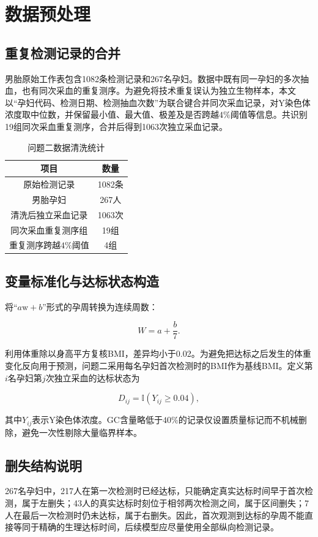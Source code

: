 \section{数据预处理}

\subsection{重复检测记录的合并}

男胎原始工作表包含1082条检测记录和267名孕妇。数据中既有同一孕妇的多次抽血，也有同次采血的重复测序。为避免将技术重复误认为独立生物样本，本文以“孕妇代码、检测日期、检测抽血次数”为联合键合并同次采血记录，对Y染色体浓度取中位数，并保留最小值、最大值、极差及是否跨越$4\%$阈值等信息。共识别19组同次采血重复测序，合并后得到1063次独立采血记录。

\begin{table}[H]
  \centering
  \caption{问题二数据清洗统计}
  \label{tab:q2-clean-summary}
  \begin{tabular}{cc}
    \toprule
    项目 & 数量 \\
    \midrule
    原始检测记录 & 1082条 \\
    男胎孕妇 & 267人 \\
    清洗后独立采血记录 & 1063次 \\
    同次采血重复测序组 & 19组 \\
    重复测序跨越$4\%$阈值 & 4组 \\
    \bottomrule
  \end{tabular}
\end{table}

\subsection{变量标准化与达标状态构造}

将“$a\mathrm{w}+b$”形式的孕周转换为连续周数：

\begin{equation}
  W=a+\frac{b}{7}.
  \label{eq:week-convert}
\end{equation}

利用体重除以身高平方复核BMI，差异均小于0.02。为避免把达标之后发生的体重变化反向用于预测，问题二采用每名孕妇首次检测时的BMI作为基线BMI。定义第$i$名孕妇第$j$次独立采血的达标状态为

\begin{equation}
  D_{ij}=\mathbb{I}\!\left(Y_{ij}\geq 0.04\right),
  \label{eq:q2-status}
\end{equation}

其中$Y_{ij}$表示Y染色体浓度。GC含量略低于$40\%$的记录仅设置质量标记而不机械删除，避免一次性剔除大量临界样本。

\subsection{删失结构说明}

267名孕妇中，217人在第一次检测时已经达标，只能确定真实达标时间早于首次检测，属于左删失；43人的真实达标时刻位于相邻两次检测之间，属于区间删失；7人在最后一次检测时仍未达标，属于右删失。因此，首次观测到达标的孕周不能直接等同于精确的生理达标时间，后续模型应尽量使用全部纵向检测记录。
